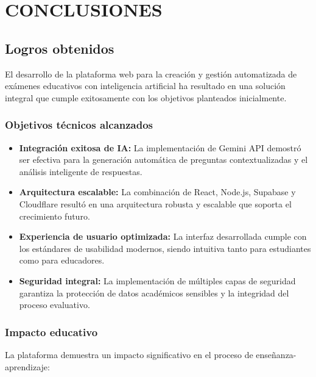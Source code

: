 \documentclass[12pt,a4paper]{report}
\begin{document}
\chapter{CONCLUSIONES}

\section{Logros obtenidos}

El desarrollo de la plataforma web para la creación y gestión automatizada de exámenes educativos con inteligencia artificial ha resultado en una solución integral que cumple exitosamente con los objetivos planteados inicialmente.

\subsection{Objetivos técnicos alcanzados}

\begin{itemize}
\item \textbf{Integración exitosa de IA:} La implementación de Gemini API demostró ser efectiva para la generación automática de preguntas contextualizadas y el análisis inteligente de respuestas.

\item \textbf{Arquitectura escalable:} La combinación de React, Node.js, Supabase y Cloudflare resultó en una arquitectura robusta y escalable que soporta el crecimiento futuro.

\item \textbf{Experiencia de usuario optimizada:} La interfaz desarrollada cumple con los estándares de usabilidad modernos, siendo intuitiva tanto para estudiantes como para educadores.

\item \textbf{Seguridad integral:} La implementación de múltiples capas de seguridad garantiza la protección de datos académicos sensibles y la integridad del proceso evaluativo.
\end{itemize}

\subsection{Impacto educativo}

La plataforma demuestra un impacto significativo en el proceso de enseñanza-aprendizaje:
\end{document}
